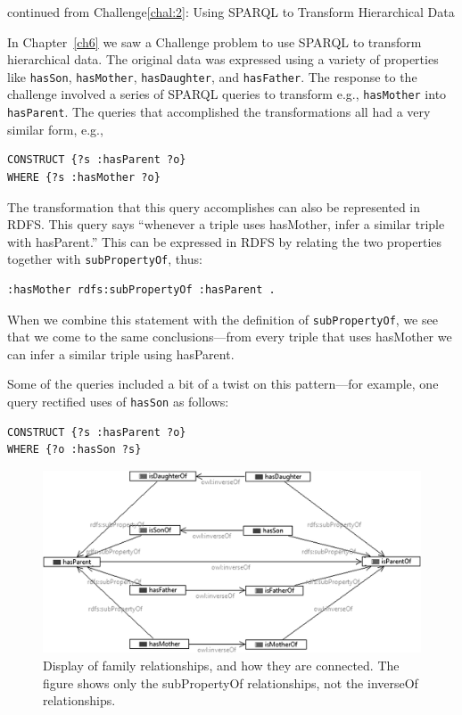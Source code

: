 \begin{challenge}{continued from Challenge\protect\ref{chal:2}: Using SPARQL to Transform Hierarchical Data}

In Chapter~\ref{ch6} we saw a Challenge problem to use SPARQL to transform
hierarchical data. The original data was expressed using a variety of
properties like \texttt{hasSon}, \texttt{hasMother}, \texttt{hasDaughter}, and \texttt{hasFather}. The
response to the challenge involved a series of SPARQL queries to
transform e.g., \texttt{hasMother} into \texttt{hasParent}. The queries that accomplished
the transformations all had a very similar form, e.g.,

\begin{lstlisting}
CONSTRUCT {?s :hasParent ?o}
WHERE {?s :hasMother ?o}
\end{lstlisting}


The transformation that this query accomplishes can also be represented
in RDFS. This query says ``whenever a triple uses hasMother, infer a
similar triple with hasParent.'' This can be expressed in RDFS by
relating the two properties together with \texttt{subPropertyOf}, thus:

\begin{lstlisting}
:hasMother rdfs:subPropertyOf :hasParent .
\end{lstlisting}

When we combine this statement with the definition of \texttt{subPropertyOf}, we
see that we come to the same conclusions---from every triple that uses
hasMother we can infer a similar triple using hasParent.

Some of the queries included a bit of a twist on this pattern---for
example, one query rectified uses of
\texttt{hasSon} as follows:

\begin{lstlisting}
CONSTRUCT {?s :hasParent ?o}
WHERE {?o :hasSon ?s}
\end{lstlisting}



\begin{figure}
\centering
\includegraphics[width=5in]{media/ch9/f09-001.png}
\caption{Display of family relationships, and how they are connected. The figure shows only the
subPropertyOf relationships, not the inverseOf relationships.}
\label{fig:ch9.1}
\end{figure}





\end{challenge}
